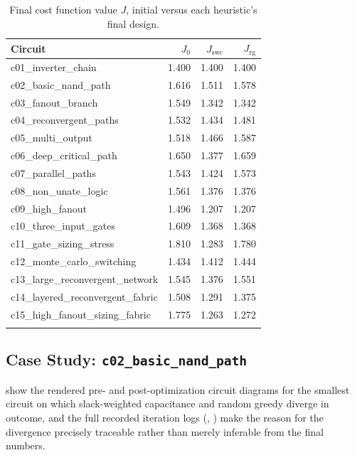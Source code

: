 \begin{longtable}{@{}lrrr@{}}
\toprule
\textbf{Circuit} & \textbf{$J_0$} & \textbf{$J_{\mathrm{swc}}$} & \textbf{$J_{\mathrm{rg}}$} \\
\midrule
\endhead
c01\_inverter\_chain            & 1.400 & 1.400 & 1.400 \\
c02\_basic\_nand\_path          & 1.616 & 1.511 & 1.578 \\
c03\_fanout\_branch             & 1.549 & 1.342 & 1.342 \\
c04\_reconvergent\_paths        & 1.532 & 1.434 & 1.481 \\
c05\_multi\_output              & 1.518 & 1.466 & 1.587 \\
c06\_deep\_critical\_path       & 1.650 & 1.377 & 1.659 \\
c07\_parallel\_paths            & 1.543 & 1.424 & 1.573 \\
c08\_non\_unate\_logic          & 1.561 & 1.376 & 1.376 \\
c09\_high\_fanout               & 1.496 & 1.207 & 1.207 \\
c10\_three\_input\_gates        & 1.609 & 1.368 & 1.368 \\
c11\_gate\_sizing\_stress       & 1.810 & 1.283 & 1.780 \\
c12\_monte\_carlo\_switching    & 1.434 & 1.412 & 1.444 \\
c13\_large\_reconvergent\_network & 1.545 & 1.376 & 1.551 \\
c14\_layered\_reconvergent\_fabric & 1.508 & 1.291 & 1.375 \\
c15\_high\_fanout\_sizing\_fabric & 1.775 & 1.263 & 1.272 \\
\bottomrule
\caption{Final cost function value $J$, initial versus
each heuristic's final design.}
\label{tab:res-cost}
\end{longtable}

\subsection{Case Study: \texttt{c02\_basic\_nand\_path}}
\label{sec:res-case-c02}

 show the rendered pre- and
post-optimization circuit diagrams for the smallest circuit on which
slack-weighted capacitance and random greedy diverge in outcome, and the
full recorded iteration logs
(,
) make the reason for the divergence
precisely traceable rather than merely inferable from the final numbers.

